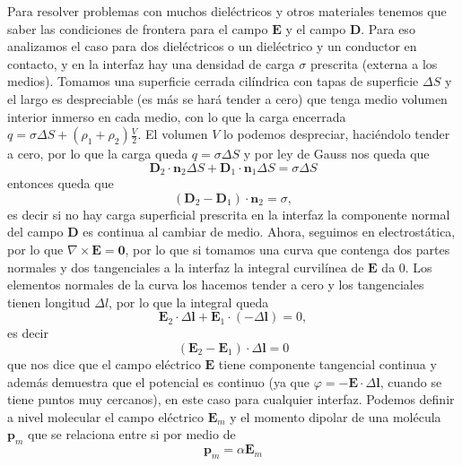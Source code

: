\documentclass[11pt,a4paper]{article}
\numberwithin{equation}{section}
\begin{document}
    Para resolver problemas con muchos dieléctricos y otros materiales tenemos que saber las condiciones de frontera para el campo $\textbf{E}$ y el campo $\textbf{D}$. Para eso analizamos el caso para dos dieléctricos o un dieléctrico y un conductor en contacto, y en la interfaz hay una densidad de carga $\sigma$ prescrita (externa a los medios). Tomamos una superficie cerrada cilíndrica con tapas de superficie $\Delta S$ y el largo es despreciable (es más se hará tender a cero) que tenga medio volumen interior inmerso en cada medio, con lo que la carga encerrada $q = \sigma \Delta S + (\rho_1 + \rho_2) \frac{V}{2}$. El volumen $V$ lo podemos despreciar, haciéndolo tender a cero, por lo que la carga queda $q = \sigma \Delta S$ y por ley de Gauss nos queda que \[\textbf{D}_2 \cdot \textbf{n}_2 \Delta S + \textbf{D}_1 \cdot \textbf{n}_1 \Delta S = \sigma \Delta S\] entonces queda que
    \begin{equation}
        (\textbf{D}_2 - \textbf{D}_1) \cdot \textbf{n}_2 = \sigma,
        \label{eq:e_desplazamiento_contorno}
    \end{equation}
    es decir si no hay carga superficial prescrita en la interfaz la componente normal del campo $\textbf{D}$ es continua al cambiar de medio. Ahora, seguimos en electrostática, por lo que $\nabla \times \textbf{E} = \textbf{0}$, por lo que si tomamos una curva que contenga dos partes normales y dos tangenciales a la interfaz la integral curvilínea de $\textbf{E}$ da 0. Los elementos normales de la curva los hacemos tender a cero y los tangenciales tienen longitud $ \Delta l$, por lo que la integral queda \[\textbf{E}_2 \cdot \Delta \textbf{l} + \textbf{E}_1 \cdot (-\Delta \textbf{l}) = 0,\] es decir
    \begin{equation}
        (\textbf{E}_2 - \textbf{E}_1) \cdot \Delta \textbf{l} = 0
        \label{eq:e_electrico_dielectrico_contorno}
    \end{equation}
    que nos dice que el campo eléctrico $\textbf{E}$ tiene componente tangencial continua y además demuestra que el potencial es continuo (ya que $\varphi = -\textbf{E} \cdot \Delta \textbf{l}$, cuando se tiene puntos muy cercanos), en este caso para cualquier interfaz. 
    Podemos definir a nivel molecular el campo eléctrico $\textbf{E}_m$ y el momento dipolar de una molécula $\textbf{p}_m$ que se relaciona entre si por medio de 
    \begin{equation}
        \textbf{p}_m = \alpha \textbf{E}_m
        \label{eq:e_momento_dipolar_molecular}
    \end{equation}
\end{document}
